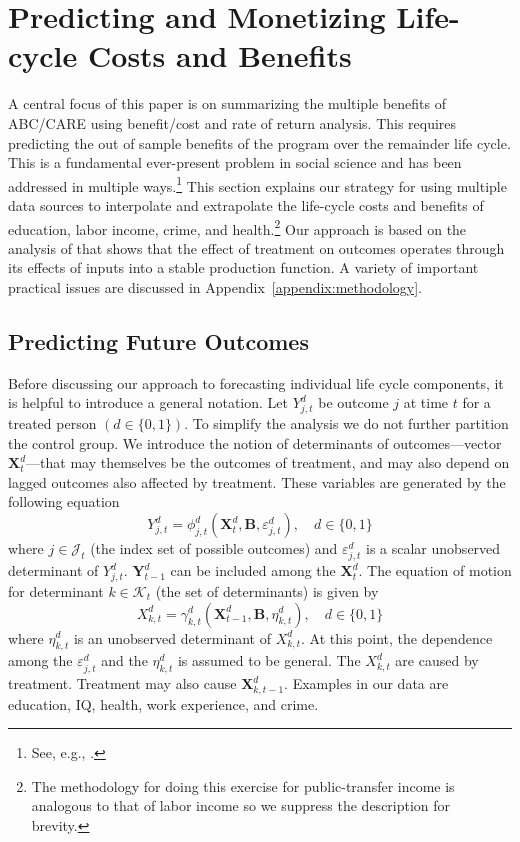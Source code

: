 \section{Predicting and Monetizing Life-cycle Costs and Benefits}\label{section:cbamethodology}

A central focus of this paper is on summarizing the multiple benefits of ABC/CARE using benefit/cost and rate of return analysis. This requires predicting the out of sample benefits of the program over the remainder life cycle. This is a fundamental ever-present problem in social science and has been addressed in multiple ways.\footnote{See, e.g., \cite{Heckman_Lochner_ea_2006_HEE}.} This section explains our strategy for using multiple data sources to interpolate and extrapolate the life-cycle costs and benefits of education, labor income, crime, and health.\footnote{The methodology for doing this exercise for public-transfer income is analogous to that of labor income so we suppress the description for brevity.} Our approach is based on the analysis of \citet{Heckman_Pinto_etal_2013_PerryFactor} that shows that the effect of treatment on outcomes operates through its effects of inputs into a stable production function. A variety of important practical issues are discussed in Appendix~\ref{appendix:methodology}.

\subsection{Predicting Future Outcomes}

Before discussing our approach to forecasting individual life cycle components, it is helpful to introduce a general notation. Let $Y^d_{j,t}$ be outcome $j$ at time $t$ for a treated person $(d\in\{0,1\})$. To simplify the analysis we do not further partition the control group. We introduce the notion of determinants of outcomes---vector $\bm{X}^d_t$---that may themselves be the outcomes of treatment, and may also depend on lagged outcomes also affected by treatment. These variables are generated by the following equation
\begin{equation}\label{eq:trenchfoot}
Y^d_{j,t} = \phi^d_{j,t} (\bm{X}^d_t, \bm{B}, \varepsilon^d_{j,t}), \quad d \in \{0,1\}
\end{equation}
where $j \in \mathcal{J}_t$ (the index set of possible outcomes) and $\varepsilon^d_{j,t}$ is a scalar unobserved determinant of $Y^d_{j,t}$. $\bm{Y}^d_{t-1}$ can be included among the $\bm{X}^d_{t}$. The equation of motion for determinant $k \in \mathcal{K}_t$ (the set of determinants) is given by
\begin{equation}\label{eq:frostbite}
X^d_{k,t} = \gamma^d_{k,t} (\bm{X}^d_{t-1}, \bm{B}, \eta^d_{k,t}), \quad d \in \{0,1\}
\end{equation}
where $\eta^d_{k,t}$ is an unobserved determinant of $X^d_{k,t}$. At this point, the dependence among the $\varepsilon^d_{j,t}$ and the $\eta^d_{k,t}$ is assumed to be general. The $X^d_{k,t}$ are caused by treatment. Treatment may also cause $\bm{X}^d_{k,t-1}$. Examples in our data are education, IQ, health, work experience, and crime.

